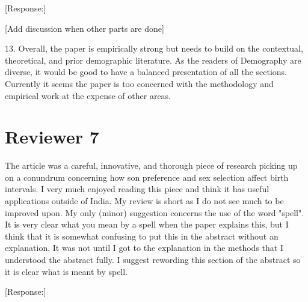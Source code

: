 \documentclass[letterpaper,12pt]{article}
\begin{document}
[Response:]

[Add discussion when other parts are done]

13. Overall, the paper is empirically strong but needs to build on the
contextual, theoretical, and prior demographic literature. As the
readers of Demography are diverse, it would be good to have a balanced
presentation of all the sections. Currently it seems the paper is too
concerned with the methodology and empirical work at the expense of
other areas.

\newpage

\section*{Reviewer 7}

The article was a careful, innovative, and thorough piece of research
picking up on a conundrum concerning how son preference and sex
selection affect birth intervals. I very much enjoyed reading this piece
and think it has useful applications outside of India.  My review is
short as I do not see much to be improved upon.  My only (minor)
suggestion concerns the use of the word "spell".  It is very clear what
you mean by a spell when the paper explains this, but I think that it is
somewhat confusing to put this in the abstract without an explanation. 
It was not until I got to the explanation in the methods that I
understood the abstract fully.  I suggest rewording this section of the
abstract so it is clear what is meant by spell.

[Response:]



\newpage


\end{document}
